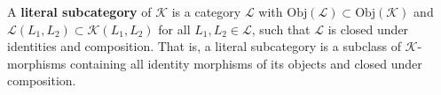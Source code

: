 A \textbf{literal subcategory} of $\mathcal{K}$ is a category $\mathcal{L}$ with $\mathrm{Obj}(\mathcal{L}) \subset \mathrm{Obj}(\mathcal{K})$ and $\mathcal{L}(L_1, L_2) \subset \mathcal{K}(L_1, L_2)$ for all $L_1, L_2 \in \mathcal{L}$, such that $\mathcal{L}$ is closed under identities and composition. That is, a literal subcategory is a subclass of $\mathcal{K}$-morphisms containing all identity morphisms of its objects and closed under composition.
